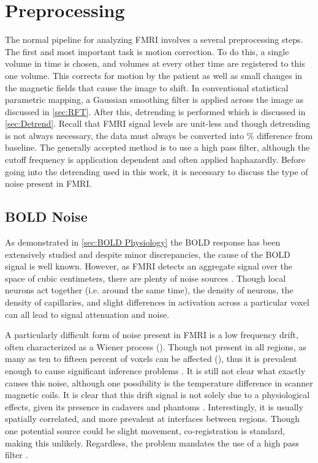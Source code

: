 \section{Preprocessing}
\label{sec:Methods Preprocessing}
The normal pipeline for analyzing
FMRI involves a several preprocessing steps. The first and most important
task is motion correction. To do this, a single volume in time is chosen, and
volumes at every other time are registered to this one volume. This corrects
for motion by the patient as well as small changes in the magnetic
fields that cause the image to shift. 
In conventional statistical parametric mapping, a Gaussian smoothing
filter is applied across the image as discussed in \autoref{sec:RFT}.
After this, detrending is performed which is discussed in \autoref{sec:Detrend}.
Recall that FMRI signal levels are unit-less and though detrending is not
always necessary, the data must always be converted 
into \% difference from baseline. 
The generally accepted method is to use a high pass filter, although the
cutoff frequency is application dependent and often applied haphazardly.
Before going into the detrending used in this work, it is necessary to 
discuss the type of noise present in FMRI.

\subsection{BOLD Noise}
\label{sec:Introduction Noise}
As demonstrated in \autoref{sec:BOLD Physiology} the BOLD response has been
extensively studied and despite minor discrepancies, the cause of the BOLD 
signal is well known. However, as FMRI detects an  
aggregate signal over the space of cubic centimeters, there are
plenty of noise sources . Though local neurons act
together (i.e. around the same time), the density of neurons, the
density of capillaries, and slight differences in activation across 
a particular voxel can all lead to signal attenuation and noise. 

A particularly difficult form of noise present in FMRI is a low frequency
drift, often characterized as a Wiener process (\cite{Riera2004}). 
Though not present in all regions, as many as ten to fifteen percent
of voxels can be affected (\cite{Tanabe2002}), thus it is prevalent enough to cause significant
inference problems \cite{Smith2007}. It is still not
clear what exactly causes this noise, although one possibility is 
the temperature difference in scanner magnetic coils\cite{Smith2007}. 
It is clear that this drift signal is not solely
due to a physiological effects, given its presence in cadavers and phantoms 
\cite{Smith1999}. Interestingly, it is usually spatially correlated, and
more prevalent at interfaces between regions. Though one potential source
could be slight movement, co-registration is standard, making this unlikely. 
Regardless, the problem mandates the use of a high pass filter \cite{Smith2007}.


